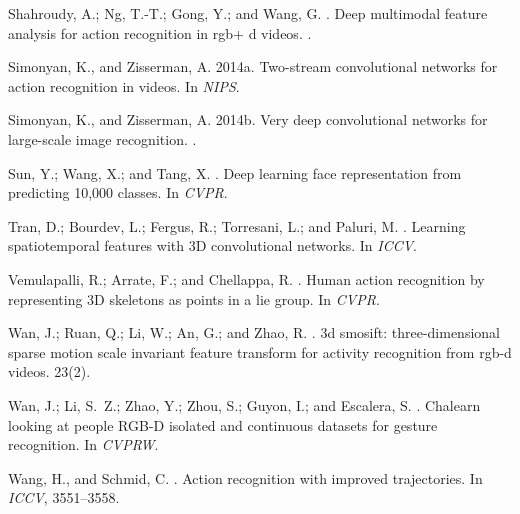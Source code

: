 \documentclass[letterpaper]{article} %
\begin{document}
\begin{thebibliography}{}
Shahroudy, A.; Ng, T.-T.; Gong, Y.; and Wang, G.
.
\newblock Deep multimodal feature analysis for action recognition in rgb+ d
  videos.
.

Simonyan, K., and Zisserman, A.
\newblock 2014a.
\newblock Two-stream convolutional networks for action recognition in videos.
\newblock In {\em NIPS}.

Simonyan, K., and Zisserman, A.
\newblock 2014b.
\newblock Very deep convolutional networks for large-scale image recognition.
.

Sun, Y.; Wang, X.; and Tang, X.
.
\newblock Deep learning face representation from predicting 10,000 classes.
\newblock In {\em CVPR}.

Tran, D.; Bourdev, L.; Fergus, R.; Torresani, L.; and Paluri, M.
.
\newblock Learning spatiotemporal features with {3D} convolutional networks.
\newblock In {\em ICCV}.

Vemulapalli, R.; Arrate, F.; and Chellappa, R.
.
\newblock Human action recognition by representing {3D} skeletons as points in
  a lie group.
\newblock In {\em CVPR}.

Wan, J.; Ruan, Q.; Li, W.; An, G.; and Zhao, R.
.
\newblock 3d smosift: three-dimensional sparse motion scale invariant feature
  transform for activity recognition from rgb-d videos.
 23(2).

Wan, J.; Li, S.~Z.; Zhao, Y.; Zhou, S.; Guyon, I.; and Escalera, S.
.
\newblock Chalearn looking at people {RGB-D} isolated and continuous datasets
  for gesture recognition.
\newblock In {\em CVPRW}.

Wang, H., and Schmid, C.
.
\newblock Action recognition with improved trajectories.
\newblock In {\em ICCV},  3551--3558.


\end{thebibliography}
\end{document}
